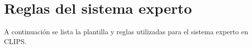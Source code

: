 \chapter{Reglas del sistema experto}
\label{cap:Reglas del sistema experto}

A continuación se lista la plantilla y reglas utilizadas para el sistema experto en CLIPS.

